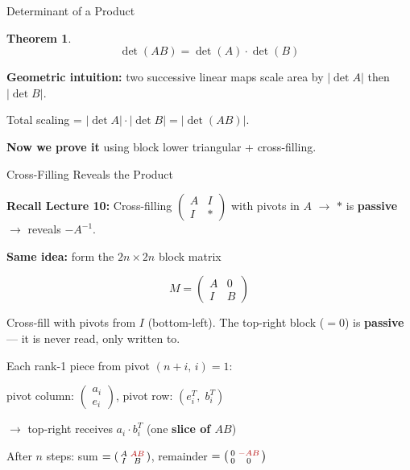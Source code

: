 \documentclass[10pt]{beamer}
\theoremstyle{definition}
\newtheorem{thm}{Theorem}[section]
\newcommand{\x}[1]{\alert{\textbf{#1}}}
\newcommand{\rd}[1]{{\color{red!70!black}#1}}
\begin{document}
\begin{frame}{Determinant of a Product}

\begin{thm}
$$\det(AB) = \det(A) \cdot \det(B)$$
\end{thm}

\vfill

\textbf{Geometric intuition:} two successive linear maps scale area by $|\det A|$ then $|\det B|$.

Total scaling = $|\det A| \cdot |\det B| = |\det(AB)|$.

\vfill

\textbf{Now we prove it} using block lower triangular + cross-filling.

\end{frame}


\begin{frame}[fragile]{Cross-Filling Reveals the Product}

\textbf{Recall Lecture 10:} Cross-filling $\left(\begin{smallmatrix} A & I \\ I & * \end{smallmatrix}\right)$ with pivots in $A$ $\to$ $*$ is \x{passive} $\to$ reveals $-A^{-1}$.

\vfill

\textbf{Same idea:} form the $2n \times 2n$ block matrix

$$M = \begin{pmatrix} A & 0 \\ I & B \end{pmatrix}$$

\vfill

Cross-fill with pivots from $I$ (bottom-left). The top-right block ($= 0$) is \x{passive} --- it is never read, only written to.

\vfill

Each rank-1 piece from pivot $(n{+}i,\, i) = 1$:

\quad pivot column: $\left(\begin{smallmatrix} a_i \\ e_i \end{smallmatrix}\right)$, \quad pivot row: $(e_i^T,\; b_i^T)$

\quad $\to$ top-right receives $a_i \cdot b_i^T$ (one \x{slice of $AB$})

\vfill

After $n$ steps: sum $= \left(\begin{smallmatrix} A & \rd{AB} \\ I & B \end{smallmatrix}\right)$, \quad remainder $= \left(\begin{smallmatrix} 0 & \rd{-AB} \\ 0 & 0 \end{smallmatrix}\right)$

\end{frame}
\end{document}

